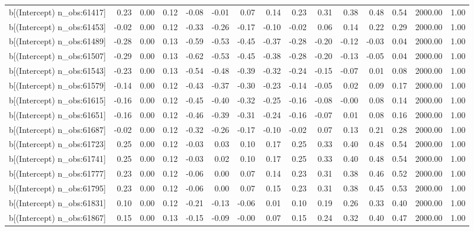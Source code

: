 \begin{table}[ht]
\begin{tabular}{rrrrrrrrrrrrrrr}
  b[(Intercept) n\_obs:61417] & 0.23 & 0.00 & 0.12 & -0.08 & -0.01 & 0.07 & 0.14 & 0.23 & 0.31 & 0.38 & 0.48 & 0.54 & 2000.00 & 1.00 \\ 
  b[(Intercept) n\_obs:61453] & -0.02 & 0.00 & 0.12 & -0.33 & -0.26 & -0.17 & -0.10 & -0.02 & 0.06 & 0.14 & 0.22 & 0.29 & 2000.00 & 1.00 \\ 
  b[(Intercept) n\_obs:61489] & -0.28 & 0.00 & 0.13 & -0.59 & -0.53 & -0.45 & -0.37 & -0.28 & -0.20 & -0.12 & -0.03 & 0.04 & 2000.00 & 1.00 \\ 
  b[(Intercept) n\_obs:61507] & -0.29 & 0.00 & 0.13 & -0.62 & -0.53 & -0.45 & -0.38 & -0.28 & -0.20 & -0.13 & -0.05 & 0.04 & 2000.00 & 1.00 \\ 
  b[(Intercept) n\_obs:61543] & -0.23 & 0.00 & 0.13 & -0.54 & -0.48 & -0.39 & -0.32 & -0.24 & -0.15 & -0.07 & 0.01 & 0.08 & 2000.00 & 1.00 \\ 
  b[(Intercept) n\_obs:61579] & -0.14 & 0.00 & 0.12 & -0.43 & -0.37 & -0.30 & -0.23 & -0.14 & -0.05 & 0.02 & 0.09 & 0.17 & 2000.00 & 1.00 \\ 
  b[(Intercept) n\_obs:61615] & -0.16 & 0.00 & 0.12 & -0.45 & -0.40 & -0.32 & -0.25 & -0.16 & -0.08 & -0.00 & 0.08 & 0.14 & 2000.00 & 1.00 \\ 
  b[(Intercept) n\_obs:61651] & -0.16 & 0.00 & 0.12 & -0.46 & -0.39 & -0.31 & -0.24 & -0.16 & -0.07 & 0.01 & 0.08 & 0.16 & 2000.00 & 1.00 \\ 
  b[(Intercept) n\_obs:61687] & -0.02 & 0.00 & 0.12 & -0.32 & -0.26 & -0.17 & -0.10 & -0.02 & 0.07 & 0.13 & 0.21 & 0.28 & 2000.00 & 1.00 \\ 
  b[(Intercept) n\_obs:61723] & 0.25 & 0.00 & 0.12 & -0.03 & 0.03 & 0.10 & 0.17 & 0.25 & 0.33 & 0.40 & 0.48 & 0.54 & 2000.00 & 1.00 \\ 
  b[(Intercept) n\_obs:61741] & 0.25 & 0.00 & 0.12 & -0.03 & 0.02 & 0.10 & 0.17 & 0.25 & 0.33 & 0.40 & 0.48 & 0.54 & 2000.00 & 1.00 \\ 
  b[(Intercept) n\_obs:61777] & 0.23 & 0.00 & 0.12 & -0.06 & 0.00 & 0.07 & 0.14 & 0.23 & 0.31 & 0.38 & 0.46 & 0.52 & 2000.00 & 1.00 \\ 
  b[(Intercept) n\_obs:61795] & 0.23 & 0.00 & 0.12 & -0.06 & 0.00 & 0.07 & 0.15 & 0.23 & 0.31 & 0.38 & 0.45 & 0.53 & 2000.00 & 1.00 \\ 
  b[(Intercept) n\_obs:61831] & 0.10 & 0.00 & 0.12 & -0.21 & -0.13 & -0.06 & 0.01 & 0.10 & 0.19 & 0.26 & 0.33 & 0.40 & 2000.00 & 1.00 \\ 
  b[(Intercept) n\_obs:61867] & 0.15 & 0.00 & 0.13 & -0.15 & -0.09 & -0.00 & 0.07 & 0.15 & 0.24 & 0.32 & 0.40 & 0.47 & 2000.00 & 1.00 \\ 

\end{tabular}
\end{table}
